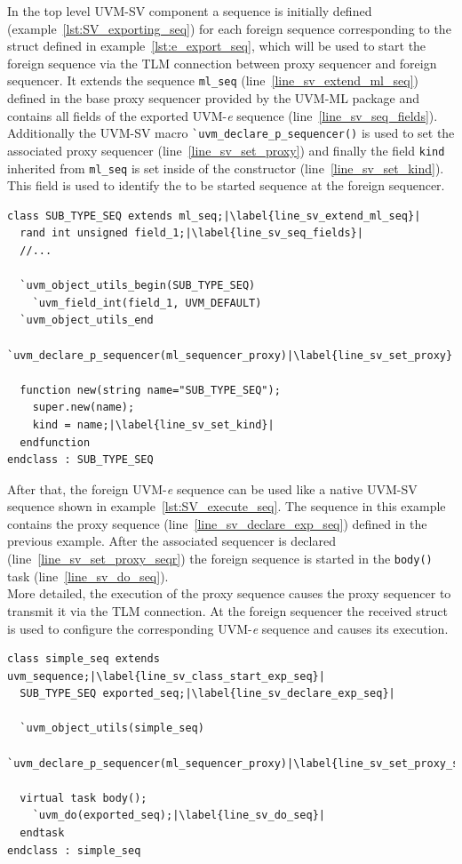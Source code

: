 In the top level UVM-SV component a sequence is initially defined (example~\ref{lst:SV_exporting_seq}) for each foreign sequence corresponding to the struct defined in example~\ref{lst:e_export_seq}, which will be used to start the foreign sequence via the TLM connection between proxy sequencer and foreign sequencer. It extends the sequence \lstinline$ml_seq$ (line~\ref{line_sv_extend_ml_seq}) defined in the base proxy sequencer provided by the UVM-ML package and contains all fields of the exported UVM-\textit{e} sequence (line~\ref{line_sv_seq_fields}). Additionally the UVM-SV macro \lstinline$`uvm_declare_p_sequencer()$ is used to set the associated proxy sequencer (line~\ref{line_sv_set_proxy}) and finally the field \lstinline$kind$ inherited from \lstinline$ml_seq$ is set inside of the constructor (line~\ref{line_sv_set_kind}). This field is used to identify the to be started sequence at the foreign sequencer.
\lstset{language=SystemVerilog, numbers = left, escapechar=|, breaklines=true}
\begin{lstlisting}[frame=htrbl, caption={SystemVerilog: exporting the UVM-\textit{e} sequence},
label={lst:SV_exporting_seq}]
class SUB_TYPE_SEQ extends ml_seq;|\label{line_sv_extend_ml_seq}|
  rand int unsigned field_1;|\label{line_sv_seq_fields}|
  //...

  `uvm_object_utils_begin(SUB_TYPE_SEQ)
    `uvm_field_int(field_1, UVM_DEFAULT)
  `uvm_object_utils_end
  `uvm_declare_p_sequencer(ml_sequencer_proxy)|\label{line_sv_set_proxy}|

  function new(string name="SUB_TYPE_SEQ");
    super.new(name);
    kind = name;|\label{line_sv_set_kind}|
  endfunction
endclass : SUB_TYPE_SEQ
\end{lstlisting}
After that, the foreign UVM-\textit{e} sequence can be used like a native UVM-SV sequence shown in example~\ref{lst:SV_execute_seq}. The sequence in this example contains the proxy sequence (line~\ref{line_sv_declare_exp_seq}) defined in the previous example. After the associated sequencer is declared (line~\ref{line_sv_set_proxy_seqr}) the foreign sequence is started in the \lstinline$body()$ task (line~\ref{line_sv_do_seq}).\\
More detailed, the execution of the proxy sequence causes the proxy sequencer to transmit it via the TLM connection. At the foreign sequencer the received struct is used to configure the corresponding UVM-\textit{e} sequence and causes its execution.
\lstset{language=SystemVerilog, numbers = left, escapechar=|, breaklines=true}
\begin{lstlisting}[frame=htrbl, caption={SystemVerilog: executing the exported UVM-\textit{e} sequence},
label={lst:SV_execute_seq}]
class simple_seq extends uvm_sequence;|\label{line_sv_class_start_exp_seq}|
  SUB_TYPE_SEQ exported_seq;|\label{line_sv_declare_exp_seq}|

  `uvm_object_utils(simple_seq)
  `uvm_declare_p_sequencer(ml_sequencer_proxy)|\label{line_sv_set_proxy_seqr}|

  virtual task body();
    `uvm_do(exported_seq);|\label{line_sv_do_seq}|
  endtask
endclass : simple_seq
\end{lstlisting}
